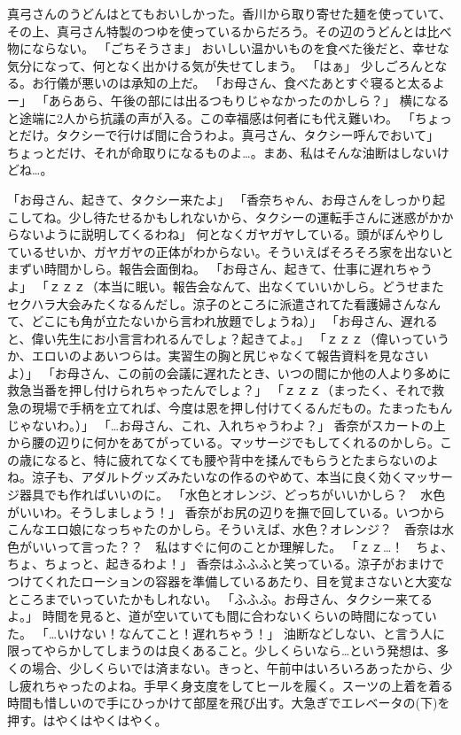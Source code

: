 真弓さんのうどんはとてもおいしかった。香川から取り寄せた麺を使っていて、その上、真弓さん特製のつゆを使っているからだろう。その辺のうどんとは比べ物にならない。
「ごちそうさま」
おいしい温かいものを食べた後だと、幸せな気分になって、何となく出かける気が失せてしまう。
「はぁ」
少しごろんとなる。お行儀が悪いのは承知の上だ。
「お母さん、食べたあとすぐ寝ると太るよー」
「あらあら、午後の部には出るつもりじゃなかったのかしら？」
横になると途端に2人から抗議の声が入る。この幸福感は何者にも代え難いわ。
「ちょっとだけ。タクシーで行けば間に合うわよ。真弓さん、タクシー呼んでおいて」
ちょっとだけ、それが命取りになるものよ…。まあ、私はそんな油断はしないけどね…。

「お母さん、起きて、タクシー来たよ」
「香奈ちゃん、お母さんをしっかり起こしてね。少し待たせるかもしれないから、タクシーの運転手さんに迷惑がかからないように説明してくるわね」
何となくガヤガヤしている。頭がぼんやりしているせいか、ガヤガヤの正体がわからない。そういえばそろそろ家を出ないとまずい時間かしら。報告会面倒ね。
「お母さん、起きて、仕事に遅れちゃうよ」
「ｚｚｚ（本当に眠い。報告会なんて、出なくていいかしら。どうせまたセクハラ大会みたくなるんだし。涼子のところに派遣されてた看護婦さんなんて、どこにも角が立たないから言われ放題でしょうね）」
「お母さん、遅れると、偉い先生にお小言言われるんでしょ？起きてよ。」
「ｚｚｚ（偉いっていうか、エロいのよあいつらは。実習生の胸と尻じゃなくて報告資料を見なさいよ）」
「お母さん、この前の会議に遅れたとき、いつの間にか他の人より多めに救急当番を押し付けられちゃったんでしょ？」
「ｚｚｚ（まったく、それで救急の現場で手柄を立てれば、今度は恩を押し付けてくるんだもの。たまったもんじゃないわ。）」
「…お母さん、これ、入れちゃうわよ？」
香奈がスカートの上から腰の辺りに何かをあてがっている。マッサージでもしてくれるのかしら。この歳になると、特に疲れてなくても腰や背中を揉んでもらうとたまらないのよね。涼子も、アダルトグッズみたいなの作るのやめて、本当に良く効くマッサージ器具でも作ればいいのに。
「水色とオレンジ、どっちがいいかしら？　水色がいいわ。そうしましょう！」
香奈がお尻の辺りを撫で回している。いつからこんなエロ娘になっちゃたのかしら。そういえば、水色？オレンジ？　香奈は水色がいいって言った？？　私はすぐに何のことか理解した。
「ｚｚ…！　ちょ、ちょ、ちょっと、起きるわよ！」
香奈はふふふと笑っている。涼子がおまけでつけてくれたローションの容器を準備しているあたり、目を覚まさないと大変なところまでいっていたかもしれない。
「ふふふ。お母さん、タクシー来てるよ。」
時間を見ると、道が空いていても間に合わないくらいの時間になっていた。
「…いけない！なんてこと！遅れちゃう！」
油断などしない、と言う人に限ってやらかしてしまうのは良くあること。少しくらいなら…という発想は、多くの場合、少しくらいでは済まない。きっと、午前中はいろいろあったから、少し疲れちゃったのよね。手早く身支度をしてヒールを履く。スーツの上着を着る時間も惜しいので手にひっかけて部屋を飛び出す。大急ぎでエレベータの(下)を押す。はやくはやくはやく。
